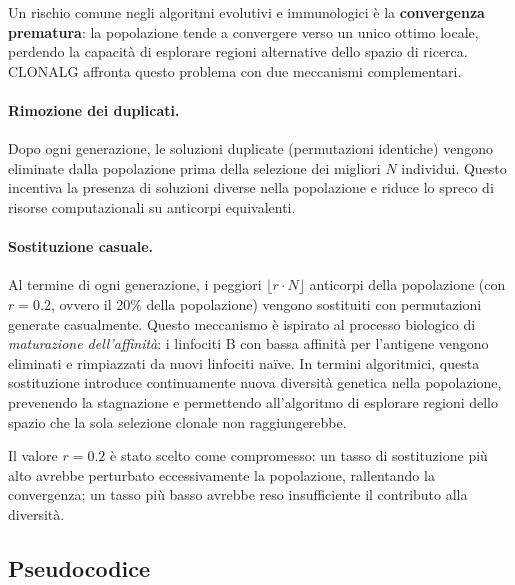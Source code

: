 \documentclass[a4paper,12pt]{article}
\begin{document}
Un rischio comune negli algoritmi evolutivi e immunologici è la \textbf{convergenza prematura}: la popolazione tende a convergere verso un unico ottimo locale, perdendo la capacità di esplorare regioni alternative dello spazio di ricerca. CLONALG affronta questo problema con due meccanismi complementari.

\paragraph{Rimozione dei duplicati.} Dopo ogni generazione, le soluzioni duplicate (permutazioni identiche) vengono eliminate dalla popolazione prima della selezione dei migliori $N$ individui. Questo incentiva la presenza di soluzioni diverse nella popolazione e riduce lo spreco di risorse computazionali su anticorpi equivalenti.

\paragraph{Sostituzione casuale.} Al termine di ogni generazione, i peggiori $\lfloor r \cdot N \rfloor$ anticorpi della popolazione (con $r = 0.2$, ovvero il 20\% della popolazione) vengono sostituiti con permutazioni generate casualmente. Questo meccanismo è ispirato al processo biologico di \emph{maturazione dell'affinità}: i linfociti B con bassa affinità per l'antigene vengono eliminati e rimpiazzati da nuovi linfociti naïve. In termini algoritmici, questa sostituzione introduce continuamente nuova diversità genetica nella popolazione, prevenendo la stagnazione e permettendo all'algoritmo di esplorare regioni dello spazio che la sola selezione clonale non raggiungerebbe.

Il valore $r = 0.2$ è stato scelto come compromesso: un tasso di sostituzione più alto avrebbe perturbato eccessivamente la popolazione, rallentando la convergenza; un tasso più basso avrebbe reso insufficiente il contributo alla diversità.

\subsection{Pseudocodice}
\end{document}
